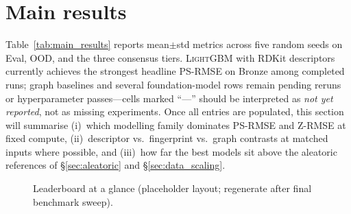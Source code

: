 \section{Main results}
\label{sec:results}

Table~\ref{tab:main_results} reports mean$\pm$std metrics across five random seeds on Eval, OOD, and the three consensus tiers.
\textsc{LightGBM} with RDKit descriptors currently achieves the strongest headline PS-RMSE on Bronze among completed runs; graph baselines and several foundation-model rows remain pending reruns or hyperparameter passes---cells marked ``---'' should be interpreted as \emph{not yet reported}, not as missing experiments.
Once all entries are populated, this section will summarise (i)~which modelling family dominates PS-RMSE and Z-RMSE at fixed compute, (ii)~descriptor vs.\ fingerprint vs.\ graph contrasts at matched inputs where possible, and (iii)~how far the best models sit above the aleatoric references of §\ref{sec:aleatoric} and §\ref{sec:data_scaling}.



\begin{figure}[h]
\centering
{}
\caption{Leaderboard at a glance (placeholder layout; regenerate after final benchmark sweep).}
\label{fig:leaderboard}
\end{figure}

